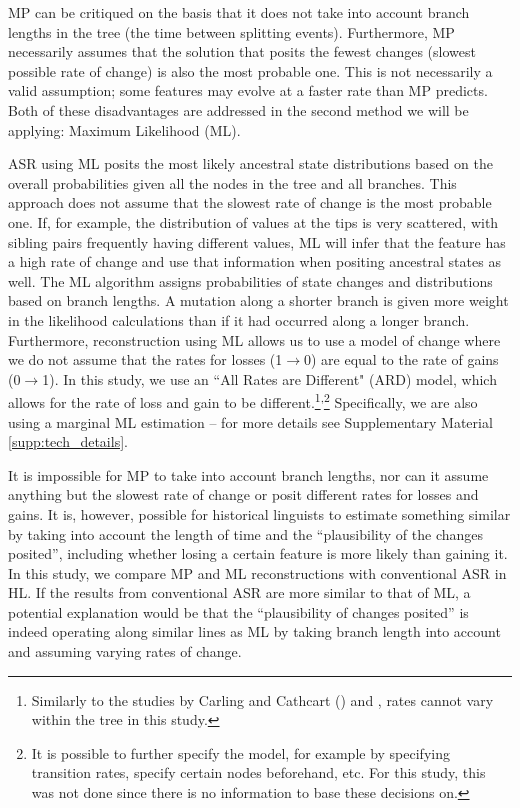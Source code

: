 \documentclass[12pt,letterpaper]{article}
\begin{document}
MP can be critiqued on the basis that it does not take into account branch lengths in the tree (the time between splitting events). Furthermore, MP necessarily assumes that the solution that posits the fewest changes (slowest possible rate of change) is also the most probable one. This is not necessarily a valid assumption; some features may evolve at a faster rate than MP predicts. Both of these disadvantages are addressed in the second method we will be applying: Maximum Likelihood (ML).

ASR using ML posits the most likely ancestral state distributions based on the overall probabilities given all the nodes in the tree and all branches. This approach does not assume that the slowest rate of change is the most probable one. If, for example, the distribution of values at the tips is very scattered, with sibling pairs frequently having different values, ML will infer that the feature has a high rate of change and use that information when positing ancestral states as well. The ML algorithm assigns probabilities of state changes and distributions based on branch lengths. A mutation along a shorter branch is given more weight in the likelihood calculations than if it had occurred along a longer branch. Furthermore, reconstruction using ML allows us to use a model of change where we do not assume that the rates for losses (1$\rightarrow$0) are equal to the rate of gains (0$\rightarrow$1). In this study, we use an ``All Rates are Different" (ARD) model, which allows for the rate of loss and gain to be different.\footnote{Similarly to the studies by Carling and Cathcart (\citeyear{carling2021reconstructing}) and \citet{goldstein_2022}, rates cannot vary within the tree in this study.}\textsuperscript{,}\footnote{It is possible to further specify the model, for example by specifying transition rates, specify certain nodes beforehand, etc. For this study, this was not done since there is no information to base these decisions on.} Specifically, we are also using a marginal ML estimation -- for more details see Supplementary Material \ref{supp:tech_details}.

It is impossible for MP to take into account branch lengths, nor can it assume anything but the slowest rate of change or posit different rates for losses and gains. It is, however, possible for historical linguists to estimate something similar by taking into account the length of time and the ``plausibility of the changes posited'', including whether losing a certain feature is more likely than gaining it. In this study, we compare MP and ML reconstructions with conventional ASR in HL. If the results from conventional ASR are more similar to that of ML, a potential explanation would be that the ``plausibility of changes posited'' is indeed operating along similar lines as ML by taking branch length into account and assuming varying rates of change.
\end{document}

